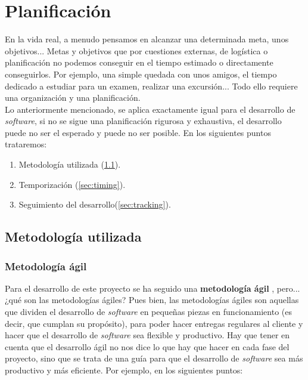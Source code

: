 \chapter{Planificación}
En la vida real, a menudo pensamos en alcanzar una determinada meta, unos objetivos...
Metas y objetivos que por cuestiones externas, de logística o planificación no podemos
conseguir en el tiempo estimado o directamente conseguirlos. Por ejemplo, una simple
quedada con unos amigos, el tiempo dedicado a estudiar para un examen, realizar una
excursión... Todo ello requiere una organización y una planificación.\\

Lo anteriormente mencionado, se aplica exactamente igual para el desarrollo de
\textit{software}, si no se sigue una planificación rigurosa y exhaustiva, el desarrollo
puede no ser el esperado y puede no ser posible. En los siguientes puntos trataremos:

    \begin{enumerate}
        \item Metodología utilizada (\ref{sec:methodology}).
        \item Temporización (\ref{sec:timing}).
        \item Seguimiento del desarrollo(\ref{sec:tracking}).
    \end{enumerate}

\section{Metodología utilizada} \label{sec:methodology}
\subsection{Metodología ágil}
Para el desarrollo de este proyecto se ha seguido una \textbf{metodología ágil}
\cite{agile-methodology}, pero...¿qué son las metodologías ágiles? Pues bien, las
metodologías ágiles son aquellas que dividen el desarrollo de \textit{software} en pequeñas
piezas en funcionamiento (es decir, que cumplan su propósito), para poder hacer entregas
regulares al cliente y hacer que el desarrollo de \textit{software} sea flexible y productivo. Hay que tener
en cuenta que el desarrollo ágil no nos dice lo que hay que hacer en cada fase del
proyecto, sino que se trata de una guía para que el desarrollo de \textit{software} sea más
productivo y más eficiente. Por ejemplo, en los siguientes puntos:

